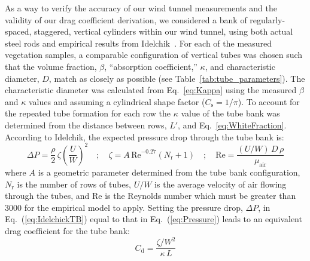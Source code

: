 \documentclass[12pt]{article}
\begin{document}
As a way to verify the accuracy of our wind tunnel measurements and the validity of our drag coefficient derivation, we considered a bank of regularly-spaced, staggered, vertical cylinders within our wind tunnel, using both actual steel rods and empirical results from Idelchik~\cite{Idelchik1994}. For each of the measured vegetation samples, a comparable configuration of vertical tubes was chosen such that the volume fraction, $\beta$, ``absorption coefficient,'' $\kappa$, and characteristic diameter, $D$, match as closely as possible (see Table~\ref{tab:tube_parameters}). The characteristic diameter was calculated from Eq.~\ref{eq:Kappa} using the measured $\beta$ and $\kappa$ values and assuming a cylindrical shape factor ($C_{\mathrm{s}} = 1/\pi$). To account for the repeated tube formation for each row the $\kappa$ value of the tube bank was determined from the distance between rows, $L'$, and Eq.~\ref{eq:WhiteFraction}. According to Idelchik, the expected pressure drop through the tube bank is:
\begin{equation}
\label{eq:IdelchickTB}
\Delta P = \frac{\rho}{2}\, \zeta  \left( \frac{U}{W} \right)^2  \quad ; \quad \zeta = A \, \mathrm{Re}^{-0.27} (N_\mathrm{r}+1) \quad ; \quad  \mathrm{Re} = \frac{(U/W) \, D \, \rho}{\mu_\mathrm{air}}
\end{equation}
where $A$ is a geometric parameter determined from the tube bank configuration, $N_\mathrm{r}$ is the number of rows of tubes, $U/W$ is the average velocity of air flowing through the tubes, and Re is the Reynolds number which must be greater than 3000 for the empirical model to apply. Setting the pressure drop, $\Delta P$, in Eq.~(\ref{eq:IdelchickTB}) equal to that in Eq.~(\ref{eq:Pressure}) leads to an equivalent drag coefficient for the tube bank:
\begin{equation}
   C_\mathrm{d} = \frac{\zeta/W^2}{\kappa \, L}
\end{equation}
\end{document}
